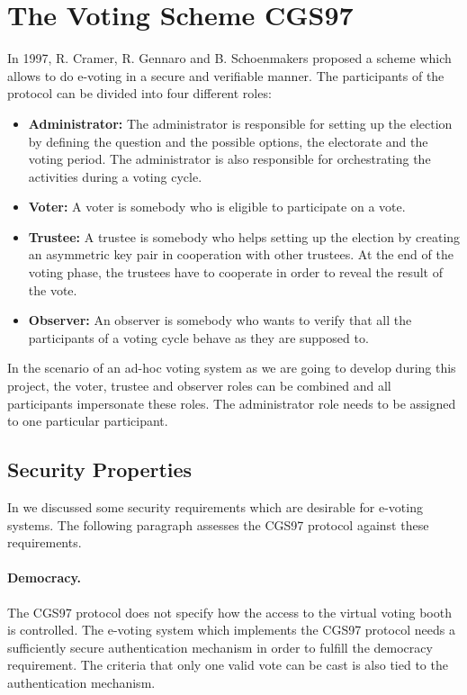 \documentclass[numbers=noenddot, abstract=on, a4paper, headsepline,
footsepline, oneside, draft=off]{scrreprt}
\begin{document}
\section{The Voting Scheme CGS97}
\label{sec:CGS97}
In 1997, R. Cramer, R. Gennaro and B. Schoenmakers proposed a scheme
\cite{CGS97} which allows to do e-voting in a secure and verifiable manner. The participants of
the protocol can be divided into four different roles:
\begin{itemize}
  \item \textbf{Administrator:} The administrator is responsible for setting up
  the election by defining the question and the possible options, the
  electorate and the voting period. The administrator is also responsible for
  orchestrating the activities during a voting cycle.
  \item \textbf{Voter:} A voter is somebody who is eligible to participate on
  a vote. 
  \item \textbf{Trustee:} A trustee is somebody who helps setting up the
  election by creating an asymmetric key pair in cooperation with other
  trustees.
  At the end of the voting phase, the trustees have to cooperate in order to
  reveal the result of the vote.
  \item \textbf{Observer:} An observer is somebody who wants to verify that all
  the participants of a voting cycle behave as they are supposed to.
\end{itemize}

In the scenario of an ad-hoc voting system as we are going to develop during
this project, the voter, trustee and observer roles can be combined and all
participants impersonate these roles. The administrator role needs to be
assigned to one particular participant.

\subsection{Security Properties}
\label{sec:secproperties}
In  we discussed some security requirements which
are desirable for e-voting systems. The following paragraph assesses the CGS97
protocol against these requirements.

\paragraph{Democracy.} The CGS97 protocol does not specify how the access to
the virtual voting booth is controlled. The e-voting system which implements
the CGS97 protocol needs a sufficiently secure authentication mechanism in order to
fulfill the democracy requirement. The criteria that only one valid vote can be
cast is also tied to the authentication mechanism.
\end{document}
